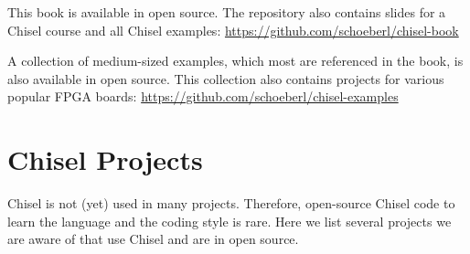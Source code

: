 \documentclass[%
    10pt,
    headinclude, footexclude,
    openright, %
    notitlepage,
    cleardoubleempty,
    headsepline,
    pointlessnumbers,
    bibtotoc, idxtotoc,
    ]{scrbook}
\begin{document}
This book is available in open source.
The repository also contains slides for a Chisel course and
all Chisel examples: \url{https://github.com/schoeberl/chisel-book}

A collection of medium-sized examples, which most are referenced
in the book, is also available in open source. This collection
also contains projects for various popular FPGA boards:
\url{https://github.com/schoeberl/chisel-examples}

\appendix

\chapter{Chisel Projects}


Chisel is not (yet) used in many projects. Therefore, open-source Chisel code
to learn the language and the coding style is rare. Here we list several projects
we are aware of that use Chisel and are in open source.
\end{document}
